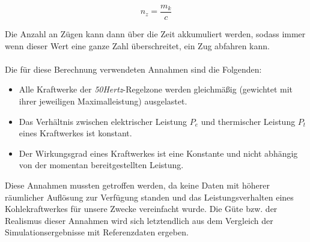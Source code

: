 \begin{equation}
    n_z=\frac{m_k}{c}\label{eq:train-amount}
\end{equation}

Die Anzahl an Zügen kann dann über die Zeit akkumuliert werden, sodass immer wenn dieser Wert eine ganze Zahl überschreitet, ein Zug abfahren kann.\\
\\
Die für diese Berechnung verwendeten Annahmen sind die Folgenden:
\begin{itemize}
    \item Alle Kraftwerke der \emph{50Hertz}-Regelzone werden gleichmäßig (gewichtet mit ihrer jeweiligen Maximalleistung) ausgelastet.
    \item Das Verhältnis zwischen elektrischer Leistung $P_e$ und thermischer Leistung $P_t$ eines Kraftwerkes ist konstant.
    \item Der Wirkungsgrad eines Kraftwerkes ist eine Konstante und nicht abhängig von der momentan bereitgestellten Leistung.
\end{itemize}
Diese Annahmen mussten getroffen werden, da keine Daten mit höherer räumlicher Auflösung zur Verfügung standen und das Leistungsverhalten eines Kohlekraftwerkes für unsere Zwecke vereinfacht wurde. Die Güte bzw. der Realismus dieser Annahmen wird sich letztendlich aus dem Vergleich der Simulationsergebnisse mit Referenzdaten ergeben.
